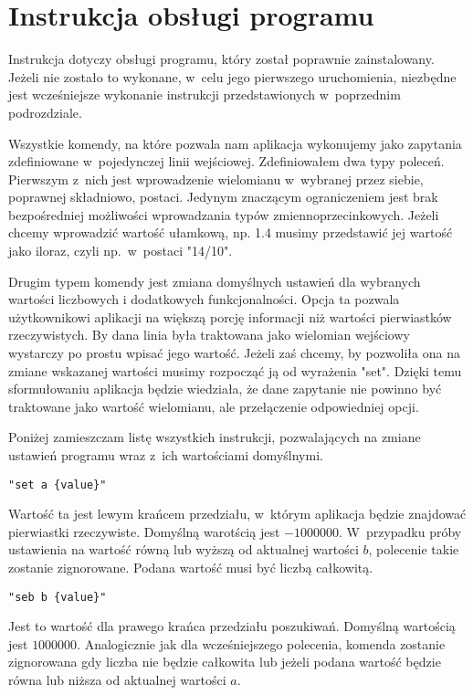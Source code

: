 \section{Instrukcja obsługi programu}

Instrukcja dotyczy obsługi programu, który został poprawnie zainstalowany. Jeżeli nie zostało to wykonane, w~celu jego pierwszego uruchomienia, niezbędne jest wcześniejsze wykonanie instrukcji przedstawionych w~poprzednim podrozdziale.

Wszystkie komendy, na które pozwala nam aplikacja wykonujemy jako zapytania zdefiniowane w~pojedynczej linii wejściowej. Zdefiniowałem dwa typy poleceń. Pierwszym z~nich jest wprowadzenie wielomianu w~wybranej przez siebie, poprawnej składniowo, postaci. Jedynym znaczącym ograniczeniem jest brak bezpośredniej możliwości wprowadzania typów zmiennoprzecinkowych. Jeżeli chcemy wprowadzić wartość ułamkową, np. 1.4 musimy przedstawić jej wartość jako iloraz, czyli np.\ w~postaci "14/10".

Drugim typem komendy jest zmiana domyślnych ustawień dla wybranych wartości liczbowych i dodatkowych funkcjonalności. Opcja ta pozwala użytkownikowi aplikacji na większą porcję informacji niż wartości pierwiastków rzeczywistych. By dana linia była traktowana jako wielomian wejściowy wystarczy po prostu wpisać jego wartość. Jeżeli zaś chcemy, by pozwoliła ona na zmiane wskazanej wartości musimy rozpocząć ją od wyrażenia "set". Dzięki temu sformułowaniu aplikacja będzie wiedziała, że dane zapytanie nie powinno być traktowane jako wartość wielomianu, ale przełączenie odpowiedniej opcji.

Poniżej zamieszczam listę wszystkich instrukcji, pozwalających na zmiane ustawień programu wraz z~ich wartościami domyślnymi.

\begin{lstlisting}
"set a {value}"
\end{lstlisting}

Wartość ta jest lewym krańcem przedziału, w~którym aplikacja będzie znajdować pierwiastki rzeczywiste. Domyślną warotścią jest $-1000000$. W~przypadku próby ustawienia na wartość równą lub wyższą od aktualnej wartości $b$, polecenie takie zostanie zignorowane. Podana wartość musi być liczbą całkowitą.

\begin{lstlisting}
"seb b {value}"
\end{lstlisting}

Jest to wartość dla prawego krańca przedziału poszukiwań. Domyślną wartością jest $1000000$. Analogicznie jak dla wcześniejszego polecenia, komenda zostanie zignorowana gdy liczba nie będzie całkowita lub jeżeli podana wartość będzie równa lub niższa od aktualnej wartości $a$.

